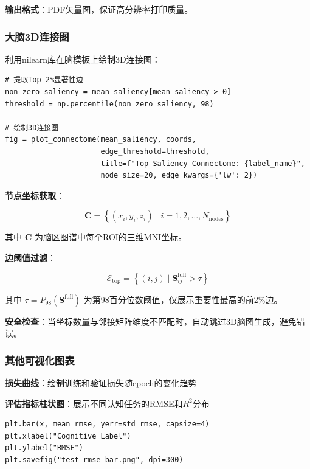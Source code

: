 \documentclass[UTF8, a4paper, 12pt]{article}
\begin{document}
\textbf{输出格式}：PDF矢量图，保证高分辨率打印质量。

\subsubsection{大脑3D连接图}

利用nilearn库在脑模板上绘制3D连接图：

\begin{verbatim}
# 提取Top 2%显著性边
non_zero_saliency = mean_saliency[mean_saliency > 0]
threshold = np.percentile(non_zero_saliency, 98)

# 绘制3D连接图
fig = plot_connectome(mean_saliency, coords, 
                      edge_threshold=threshold,
                      title=f"Top Saliency Connectome: {label_name}",
                      node_size=20, edge_kwargs={'lw': 2})
\end{verbatim}

\textbf{节点坐标获取}：

\begin{equation}
\mathbf{C} = \left\{ (x_i, y_i, z_i) \mid i = 1, 2, \ldots, N_{\text{nodes}} \right\}
\end{equation}

其中 $\mathbf{C}$ 为脑区图谱中每个ROI的三维MNI坐标。

\textbf{边阈值过滤}：

\begin{equation}
\mathcal{E}_{\text{top}} = \left\{ (i,j) \mid \mathbf{S}^{\text{full}}_{ij} > \tau \right\}
\end{equation}

其中 $\tau = P_{98}(\mathbf{S}^{\text{full}})$ 为第98百分位数阈值，仅展示重要性最高的前2\%边。

\textbf{安全检查}：当坐标数量与邻接矩阵维度不匹配时，自动跳过3D脑图生成，避免错误。

\subsubsection{其他可视化图表}

\textbf{损失曲线}：绘制训练和验证损失随epoch的变化趋势

\textbf{评估指标柱状图}：展示不同认知任务的RMSE和$R^2$分布

\begin{verbatim}
plt.bar(x, mean_rmse, yerr=std_rmse, capsize=4)
plt.xlabel("Cognitive Label")
plt.ylabel("RMSE")
plt.savefig("test_rmse_bar.png", dpi=300)
\end{verbatim}
\end{document}

